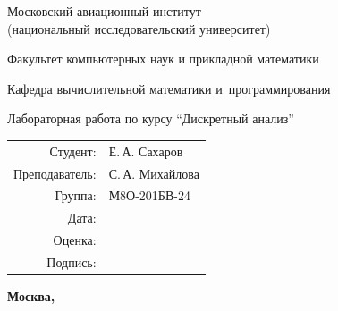 \begin{titlepage}
\begin{center}
\bfseries

{\Large Московский авиационный институт\\ (национальный исследовательский университет)

}

\vspace{48pt}

{\large Факультет компьютерных наук и прикладной математики
}

\vspace{36pt}

{\large Кафедра вычислительной математики и~программирования

}


\vspace{48pt}

Лабораторная работа  по курсу \enquote{Дискретный анализ}

\end{center}

\vspace{72pt}

\begin{flushright}
\begin{tabular}{rl}
Студент: & Е.\,А. Сахаров \\
Преподаватель: & С.\,А. Михайлова \\
Группа: & М8О-201БВ-24 \\
Дата: & \\
Оценка: & \\
Подпись: & \\
\end{tabular}
\end{flushright}

\vfill

\begin{center}
\bfseries
Москва, \the\year
\end{center}
\end{titlepage}

\pagebreak
